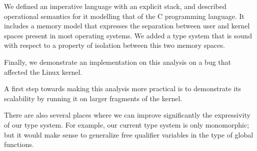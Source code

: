 We defined an imperative language with an explicit stack, and described
operational semantics for it modelling that of the C programming language. It
includes a memory model that expresses the separation between user and kernel
spaces present in most operating systems. We added a type system that is sound
with respect to a property of isolation between this two memory spaces.

Finally, we demonstrate an implementation on this analysis on a bug that
affected the Linux kernel.

A first step towards making this analysis more practical is to demonstrate its
scalability by running it on larger fragments of the kernel.

There are also several places where we can improve significantly the
expressivity of our type system. For example, our current type system is only
monomorphic; but it would make sense to generalize free qualifier variables in
the type of global functions.%
